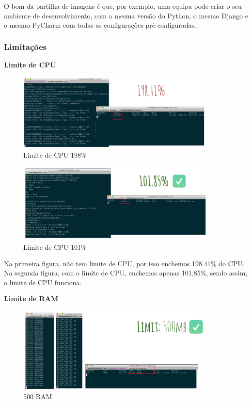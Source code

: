 \documentclass[pdftex,12pt,a4paper]{report}
\begin{document}
O bom da partilha de imagens é que, por exemplo, uma equipa pode criar o seu ambiente de desenvolvimento, com a mesma versão do Python, o mesmo Django e o mesmo PyCharm com todas as configurações pré-configuradas.

\subsubsection{Limitações}

\textbf{Limite de CPU}

\begin{figure}[!htb]
\center
 \includegraphics[width=100mm,scale=1]{imagens/cpu_limit_198.png}
 \caption{Limite de CPU 198\%}
 \label{fig:cpu_limit_198}
\end{figure}

\begin{figure}[!htb]
\center
 \includegraphics[width=100mm,scale=1]{imagens/cpu_limit_101.png}
 \caption{Limite de CPU 101\%}
 \label{fig:cpu_limit_101}
\end{figure}

Na primeira figura, não tem limite de CPU, por isso enchemos 198.41\% do CPU. Na segunda figura, com o limite de CPU, enchemos apenas 101.85\%, sendo assim, o limite de CPU funciona.

\textbf{Limite de RAM}

\begin{figure}[!htb]
\center
 \includegraphics[width=100mm,scale=1]{imagens/memory_500.png}
 \caption{500 RAM}
 \label{fig:memory_500}
\end{figure}
\end{document}

